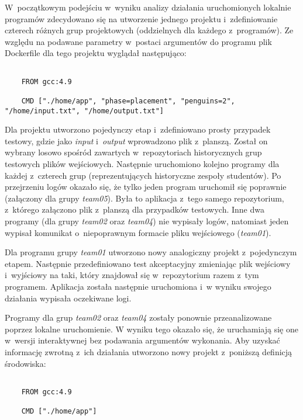 W~początkowym podejściu w~wyniku analizy działania uruchomionych lokalnie programów zdecydowano się na utworzenie jednego projektu i~zdefiniowanie czterech różnych grup projektowych (oddzielnych dla każdego z~programów).
Ze względu na podawane parametry w~postaci argumentów do programu plik Dockerfile dla tego projektu wyglądał następująco:

{\selectfont
\tiny
\begin{lstlisting}

    FROM gcc:4.9

    CMD ["./home/app", "phase=placement", "penguins=2", "/home/input.txt", "/home/output.txt"]

\end{lstlisting}
}

Dla projektu utworzono pojedynczy etap i~zdefiniowano prosty przypadek testowy, gdzie jako \textit{input} i~\textit{output} wprowadzono plik z~planszą.
Został on wybrany losowo spośród zawartych w~repozytoriach historycznych grup testowych plików wejściowych.
Następnie uruchomiono kolejno programy dla każdej z~czterech grup (reprezentujących historyczne zespoły studentów).
Po przejrzeniu logów okazało się, że tylko jeden program uruchomił się poprawnie (załączony dla grupy \textit{team05}).
Była to aplikacja z~tego samego repozytorium, z~którego załączono plik z~planszą dla przypadków testowych.
Inne dwa programy (dla grupy \textit{team02} oraz \textit{team04}) nie wypisały logów, natomiast jeden wypisał komunikat o~niepoprawnym formacie pliku wejściowego (\textit{team01}).

Dla programu grupy \textit{team01} utworzono nowy analogiczny projekt z~pojedynczym etapem.
Następnie przedefiniowano test akceptacyjny zmieniając plik wejściowy i~wyjściowy na taki, który znajdował się w~repozytorium razem z~tym programem.
Aplikacja została następnie uruchomiona i~w wyniku swojego działania wypisała oczekiwane logi.

Programy dla grup \textit{team02} oraz \textit{team04} zostały ponownie przeanalizowane poprzez lokalne uruchomienie.
W wyniku tego okazało się, że uruchamiają się one w~wersji interaktywnej bez podawania argumentów wykonania.
Aby uzyskać informację zwrotną z~ich działania utworzono nowy projekt z~poniższą definicją środowiska:

{\selectfont
\tiny
\begin{lstlisting}

    FROM gcc:4.9

    CMD ["./home/app"]

\end{lstlisting}
}

